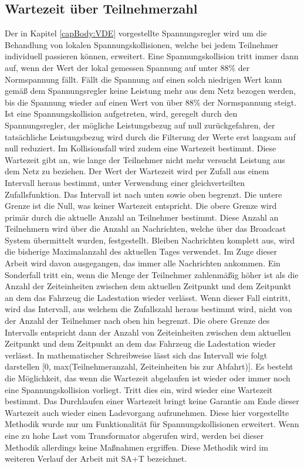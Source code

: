 \subsection{Wartezeit über Teilnehmerzahl}
\label{cap:background_sec:SA_participants}
Der in Kapitel \ref{capBody:VDE} vorgestellte Spannungsregler wird um die Behandlung von lokalen Spannungskollisionen, welche bei jedem Teilnehmer individuell passieren können, erweitert. Eine Spannungskollision tritt immer dann auf, wenn der Wert der lokal gemessen Spannung auf unter 88\% der Normspannung fällt. Fällt die Spannung auf einen solch niedrigen Wert kann gemäß dem Spannungsregler keine Leistung mehr aus dem Netz bezogen werden, bis die Spannung wieder auf einen Wert von über 88\% der Normspannung steigt. Ist eine Spannungskollision aufgetreten, wird, geregelt durch den Spannungsregler, der mögliche Leistungsbezug auf null zurückgefahren, der tatsächliche Leistungsbezug wird durch die Filterung der Werte erst langsam auf null reduziert. Im Kollisionsfall wird zudem eine Wartezeit bestimmt. Diese Wartezeit gibt an, wie lange der Teilnehmer nicht mehr versucht Leistung aus dem Netz zu beziehen. Der Wert der Wartezeit wird per Zufall aus einem Intervall heraus bestimmt, unter Verwendung einer gleichverteilten Zufallsfunktion. Das Intervall ist nach unten sowie oben begrenzt. Die untere Grenze ist die Null, was keiner Wartezeit entspricht. Die obere Grenze wird primär durch die aktuelle Anzahl an Teilnehmer bestimmt. Diese Anzahl an Teilnehmern wird über die Anzahl an Nachrichten, welche über das Broadcast System übermittelt wurden, festgestellt. Bleiben Nachrichten komplett aus, wird die bisherige Maximalanzahl des aktuellen Tages verwendet. Im Zuge dieser Arbeit wird davon ausgegangen, das immer alle Nachrichten ankommen. Ein Sonderfall tritt ein, wenn die Menge der Teilnehmer zahlenmäßig höher ist als die Anzahl der Zeiteinheiten zwischen dem aktuellen Zeitpunkt und dem Zeitpunkt an dem das Fahrzeug die Ladestation wieder verlässt. Wenn dieser Fall eintritt, wird das Intervall, aus welchem die Zufallszahl heraus bestimmt wird, nicht von der Anzahl der Teilnehmer nach oben hin begrenzt. Die obere Grenze des Intervalls entspricht dann der Anzahl von Zeiteinheiten zwischen dem aktuellen Zeitpunkt und dem Zeitpunkt an dem das Fahrzeug die Ladestation wieder verlässt.  In mathematischer Schreibweise lässt sich das Intervall wie folgt darstellen [0, max(Teilnehmeranzahl, Zeiteinheiten bis zur Abfahrt)]. Es besteht die Möglichkeit, das wenn die Wartezeit abgelaufen ist wieder oder immer noch eine Spannungskollision vorliegt. Tritt dies ein, wird wieder eine Wartezeit bestimmt. Das Durchlaufen einer Wartezeit bringt keine Garantie am Ende dieser Wartezeit auch wieder einen Ladevorgang aufzunehmen. Diese hier vorgestellte Methodik wurde nur um Funktionalität für Spannungskollisionen erweitert. Wenn eine zu hohe Last vom Transformator abgerufen wird, werden bei dieser Methodik allerdings keine Maßnahmen ergriffen. Diese Methodik wird im weiteren Verlauf der Arbeit mit SA+T bezeichnet.\\
